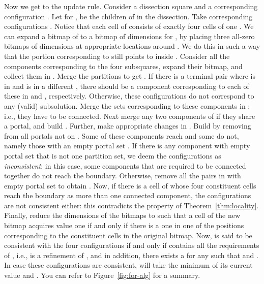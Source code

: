 \documentclass[extras,11pt]{article} \usepackage{fullpage}
\theoremstyle{mytheorem}
\begin{document}
Now we get to the update rule.
Consider a dissection square  and a corresponding configuration .
Let  for , be the children of  in the dissection.
Take corresponding configurations .
Notice that each cell of  consists of exactly four cells of one .
We can expand a bitmap  of  to a bitmap  of dimensions  for ,
by placing three all-zero bitmaps of dimensions  at appropriate locations around .
We do this in such a way that the portion corresponding to  still points to  inside .
Consider all the components  corresponding to the four subsquares, expand their bitmap, and collect them in .
Merge the partitions  to get .
If there is a terminal pair  where  is in  and  is in a different ,
there should be a component corresponding to each of these in  and , respectively.
Otherwise, these configurations do not correspond to any (valid) subsolution.
Merge the sets corresponding to these components in : i.e., they have to be connected.
Next merge any two components of  if they share a portal, and build .
Further, make appropriate changes in .
Build   by removing from  all portals not on .
Some of these components reach  and some do not, namely those with an empty portal set .
If there is any component with empty portal set that is not  one partition set,
we deem the configurations  as \emph{inconsistent}:
in this case, some components that are required to be connected together do not reach the boundary.
Otherwise, remove all the pairs in  with empty portal set to obtain .
Now, if there is a cell of  whose four constituent cells reach the boundary as more than one connected component, the configurations are not consistent either: this contradicts the property of Theorem~\ref{thm:locality}.
Finally, reduce the dimensions of the bitmaps to  such that a cell of the new bitmap acquires value one if and only if there is a one in one of the positions corresponding to the constituent cells in the original bitmap.
Now,  is said to be consistent with the four configurations  if and only if  contains all the requirements of , i.e.,  is a refinement of , and in addition, there exists a  for any  such that  and .  In case these configurations are consistent,
  will take the minimum of its current value and .
You can refer to Figure~\ref{fig:for-alg} for a summary.
\end{document}
